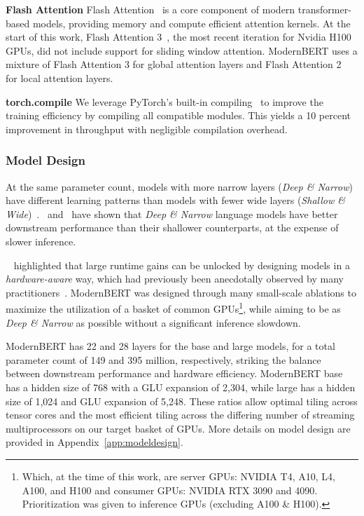 \documentclass[11pt]{article}
\begin{document}
\textbf{Flash Attention} Flash Attention~\cite{FA} is a core component of modern transformer-based models, providing memory and compute efficient attention kernels. At the start of this work, Flash Attention 3~\cite{flash-attention-3}, the most recent iteration for Nvidia H100 GPUs, did not include support for sliding window attention. ModernBERT uses a mixture of Flash Attention 3 for global attention layers and Flash Attention 2~\cite{FA2} for local attention layers.  

\textbf{torch.compile} We leverage PyTorch's built-in compiling~\cite{ansel2024pytorch} to improve the training efficiency by compiling all compatible modules. This yields a 10 percent improvement in throughput with negligible compilation overhead.


\subsubsection{Model Design}
\label{sec:modeldesign}


At the same parameter count, models with more narrow layers (\textit{Deep \& Narrow}) have different learning patterns than models with fewer wide layers (\textit{Shallow \& Wide})~\cite{nguyen2021do}.~\citet{efficientT5} and~\cite{mobilellm} have shown that \textit{Deep \& Narrow} language models have better downstream performance than their shallower counterparts, at the expense of slower inference.

~\citet{codesigning} highlighted that large runtime gains can be unlocked by designing models in a \textit{hardware-aware} way, which had previously been anecdotally observed by many practitioners~\cite{megatron,karpathy,neox}. ModernBERT was designed through many small-scale ablations to maximize the utilization of a basket of common GPUs\footnote{Which, at the time of this work, are server GPUs: NVIDIA T4, A10, L4, A100, and H100 and consumer GPUs: NVIDIA RTX 3090 and 4090. Prioritization was given to inference GPUs (excluding A100 \& H100).}, while aiming to be as \textit{Deep \& Narrow} as possible without a significant inference slowdown.

ModernBERT has 22 and 28 layers for the base and large models, for a total parameter count of 149 and 395 million, respectively, striking the balance between downstream performance and hardware efficiency. ModernBERT base has a hidden size of 768 with a GLU expansion of 2,304, while large has a hidden size of 1,024 and GLU expansion of 5,248. These ratios allow optimal tiling across tensor cores and the most efficient tiling across the differing number of streaming multiprocessors on our target basket of GPUs. More details on model design are provided in Appendix~\ref{app:modeldesign}.
\end{document}
